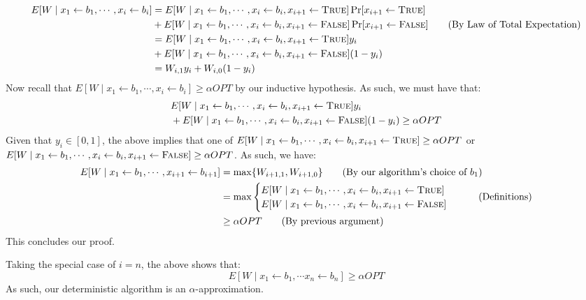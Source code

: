 \documentclass[12pt]{exam}
\begin{document}
\begin{questions}
\begin{solution}
\begin{enumerate}[label=(\alph*)]
      \begin{align*}
        E[W \mid x_1 \gets b_1, \cdots, x_i \gets b_i] &= E[W \mid  x_1 \gets b_1, \cdots, x_i \gets b_i, x_{i+1} \gets \textsc{True} ]\Pr[x_{i+1} \gets \textsc{True}] \\
        &+E[W \mid  x_1 \gets b_1, \cdots, x_i \gets b_i, x_{i+1} \gets \textsc{False} ]\Pr[x_{i+1} \gets \textsc{False}] \tag{By Law of Total Expectation} \\
        &= E[W \mid  x_1 \gets b_1, \cdots, x_i \gets b_i, x_{i+1} \gets \textsc{True} ]y_i \\
        &+ E[W \mid  x_1 \gets b_1, \cdots, x_i \gets b_i, x_{i+1} \gets \textsc{False} ](1-y_i) \\
        &= W_{i,1} y_i + W_{i,0} (1-y_i)
      \end{align*}
      Now recall that $E[W\mid x_1 \gets b_1, \cdots, x_i \gets b_i] \geq \alpha OPT$ by our inductive hypothesis. As such, we must have that:
      \begin{align*}
        &E[W \mid  x_1 \gets b_1, \cdots, x_i \gets b_i, x_{i+1} \gets \textsc{True} ]y_i \\
        &+ E[W \mid  x_1 \gets b_1, \cdots, x_i \gets b_i, x_{i+1} \gets \textsc{False} ](1-y_i) \geq \alpha OPT
      \end{align*}
      Given that $y_i \in [0,1]$, the above implies that one of $E[W \mid  x_1 \gets b_1, \cdots, x_i \gets b_i, x_{i+1} \gets \textsc{True} ] \geq \alpha OPT$ or $E[W \mid  x_1 \gets b_1, \cdots, x_i \gets b_i, x_{i+1} \gets \textsc{False} ] \geq \alpha OPT$. As such, we have:
      \begin{align*}
        E[W \mid x_1 \gets b_1, \cdots, x_{i+1} \gets b_{i+1}] &= \max\{ W_{i+1,1}, W_{i+1,0} \} \tag{By our algorithm's choice of $b_1$} \\
        &= \max \begin{cases}
          E[W \mid  x_1 \gets b_1, \cdots, x_i \gets b_i, x_{i+1} \gets \textsc{True} ] \\
          E[W \mid  x_1 \gets b_1, \cdots, x_i \gets b_i, x_{i+1} \gets \textsc{False} ]
        \end{cases}  \tag{Definitions} \\
        &\geq \alpha OPT \tag{By previous argument}
      \end{align*}
      This concludes our proof.
  \end{enumerate} 
  Taking the special case of $i = n$, the above shows that:
  \[
    E[W \mid x_1 \gets b_1, \cdots x_n \gets b_n] \geq \alpha OPT
  \]
  As such, our deterministic algorithm is an $\alpha$-approximation.
\end{solution}



\end{questions}
\end{document}
